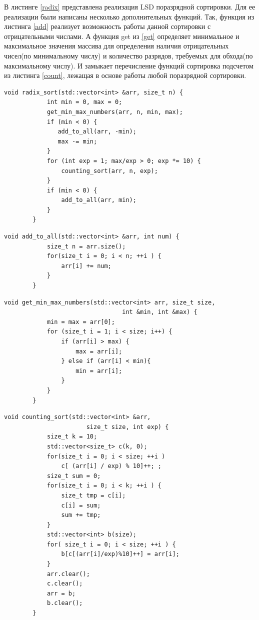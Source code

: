 \documentclass[a4paper, 14pt]{article}
\begin{document}
		В листинге \ref{radix} представлена реализация LSD поразрядной сортировки. Для ее реализации были написаны несколько дополнительных функций. Так, функция из листинга \ref{add} реализует возможность работы данной сортировки с отрицательными числами. А функция get из \ref{get} определяет минимальное и максимальное значения массива для определения наличия отрицательных чисел(по минимальному числу) и количество разрядов, требуемых для обхода(по максимальному числу). И замыкает перечисление функций сортировка подсчетом из листинга \ref{count}, лежащая в основе работы любой поразрядной сортировки.
	
	\begin{lstlisting}[label=radix,caption=Поразрядная LSD сортировка]
        void radix_sort(std::vector<int> &arr, size_t n) {
            int min = 0, max = 0;
            get_min_max_numbers(arr, n, min, max);
            if (min < 0) {
               add_to_all(arr, -min);
               max -= min;
            }
            for (int exp = 1; max/exp > 0; exp *= 10) {
                counting_sort(arr, n, exp);
            }
            if (min < 0) {  
                add_to_all(arr, min); 
            }
        }
	\end{lstlisting}
	\begin{lstlisting}[label=add,caption=Функция прибавляющая число к каждому элементу массива]
        void add_to_all(std::vector<int> &arr, int num) {
            size_t n = arr.size();
            for(size_t i = 0; i < n; ++i ) {
                arr[i] += num;
            }
        }
	\end{lstlisting}
	\begin{lstlisting}[label=get,caption=Функция получающая минимум и максимум в массиве]
        void get_min_max_numbers(std::vector<int> arr, size_t size,
                                 int &min, int &max) {
            min = max = arr[0];
            for (size_t i = 1; i < size; i++) {
                if (arr[i] > max) {
                    max = arr[i];
                } else if (arr[i] < min){
                    min = arr[i];
                }
            }
        }
	\end{lstlisting}
	
		\begin{lstlisting}[label=count,caption=Сортировка подсчетом]
           void counting_sort(std::vector<int> &arr,
                       size_t size, int exp) {
            size_t k = 10;
            std::vector<size_t> c(k, 0);
            for(size_t i = 0; i < size; ++i )
                c[ (arr[i] / exp) % 10]++; ;
            size_t sum = 0;
            for(size_t i = 0; i < k; ++i ) {
                size_t tmp = c[i];
                c[i] = sum;
                sum += tmp;
            }
            std::vector<int> b(size);
            for( size_t i = 0; i < size; ++i ) {
                b[c[(arr[i]/exp)%10]++] = arr[i];
            }
            arr.clear();
            c.clear();
            arr = b;
            b.clear();
        }
	\end{lstlisting}
	
\end{document}
